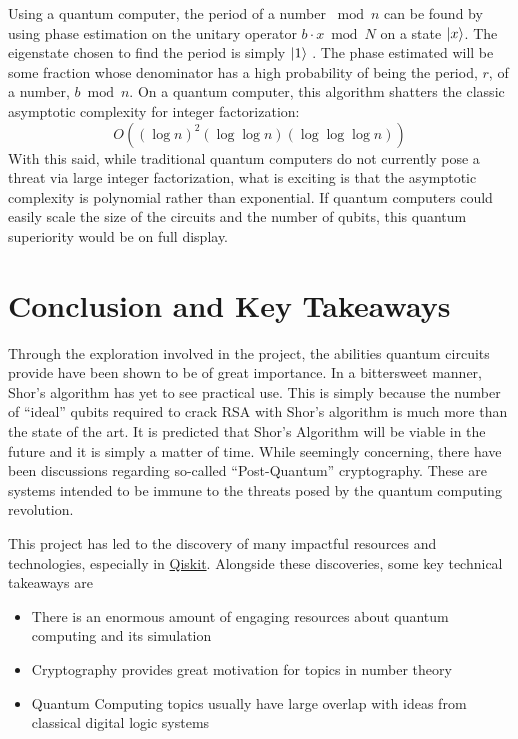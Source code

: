 \documentclass[journal]{IEEEtran}
\begin{document}
Using a quantum computer, the period of a number \(\bmod n\) can be found by
using phase estimation on the unitary operator \(b\cdot x \bmod N\) on a state
\(\ket{x}\). The eigenstate chosen to find the period is simply \(\ket{1}\) .
The phase estimated will be some fraction whose denominator has a high
probability of being the period, \(r\), of a number, \(b \bmod n\).  On a quantum
computer, this algorithm shatters the classic asymptotic complexity for integer factorization:
\[
    O\left((\log n)^{2}(\log\log n)(\log\log\log n)\right)
\]
With this said, while traditional quantum computers do not currently pose a
threat via large integer factorization, what is exciting is that the asymptotic
complexity is polynomial rather than exponential. If quantum computers could
easily scale the size of the circuits and the number of qubits, this quantum
superiority would be on full display.

\section{Conclusion and Key Takeaways}

Through the exploration involved in the project, the abilities quantum circuits
provide have been shown to be of great importance. In a bittersweet manner,
Shor's algorithm has yet to see practical use. This is simply because the number
of ``ideal'' qubits required to crack RSA with Shor's algorithm is much more
than the state of the art. It is predicted that Shor's Algorithm will be viable
in the future and it is simply a matter of time. While seemingly concerning,
there have been discussions regarding so-called ``Post-Quantum'' cryptography.
These are systems intended to be immune to the threats posed by the quantum
computing revolution.

This project has led to the discovery of many impactful resources and
technologies, especially in \href{https://qiskit.org/}{Qiskit}. Alongside these discoveries, some key technical
takeaways are

\begin{itemize}
    \item There is an enormous amount of engaging resources about quantum computing and its simulation
    \item Cryptography provides great motivation for topics in number theory
    \item Quantum Computing topics usually have large overlap with ideas from classical digital logic systems
\end{itemize}

% 
% 
\printbibliography

\end{document}
